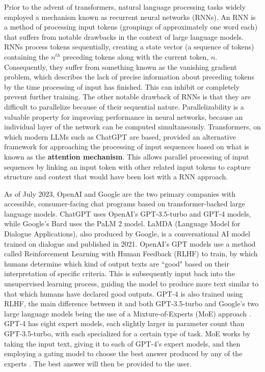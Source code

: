 \documentclass[letterpaper,12pt]{article}
\begin{document}
Prior to the advent of transformers, natural language processing tasks widely employed a mechanism known as recurrent neural networks (RNNs). An RNN is a method of processing input tokens (groupings of approximately one word each) that suffers from notable drawbacks in the context of large language models. RNNs process tokens sequentially, creating a state vector (a sequence of tokens) containing the $n^{th}$ preceding tokens along with the current token, $n$. Consequently, they suffer from something known as the vanishing gradient problem, which describes the lack of precise information about preceding tokens by the time processing of input has finished. This can inhibit or completely prevent further training. The other notable drawback of RNNs is that they are difficult to parallelize because of their sequential nature. Parallelizability is a valuable property for improving performance in neural networks, because an individual layer of the network can be computed simultaneously. Transformers, on which modern LLMs such as ChatGPT are based, provided an alternative framework for approaching the processing of input sequences based on what is known as the \textbf{attention mechanism}. This allows parallel processing of input sequences by linking an input token with other related input tokens to capture structure and context that would have been lost with a RNN approach.

As of July 2023, OpenAI and Google are the two primary companies with accessible, consumer-facing chat programs based on transformer-backed large language models. ChatGPT uses OpenAI's GPT-3.5-turbo and GPT-4 models, while Google's Bard uses the PaLM 2 model. LaMDA (Language Model for Dialogue Applications), also produced by Google, is a conversational AI model trained on dialogue and published in 2021. OpenAI's GPT models use a method called Reinforcement Learning with Human Feedback (RLHF) to train, by which humans determine which kind of output texts are ``good" based on their interpretation of specific criteria. This is subsequently input back into the unsupervised learning process, guiding the model to produce more text similar to that which humans have declared good outputs. GPT-4 is also trained using RLHF, the main difference between it and both GPT-3.5-turbo and Google's two large language models being the use of a Mixture-of-Experts (MoE) approach \cite{gpt4moe}. GPT-4 has eight expert models, each slightly larger in parameter count than GPT-3.5-turbo, with each specialized for a certain type of task. MoE works by taking the input text, giving it to each of GPT-4's expert models, and then employing a gating model to choose the best answer produced by any of the experts \cite{shazeer2017outrageously}. The best answer will then be provided to the user.
\end{document}
